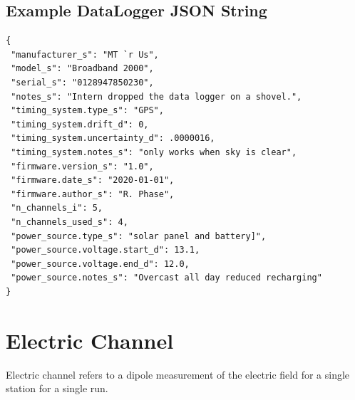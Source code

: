 \documentclass{article}
\begin{document}
\newpage
\subsection{Example DataLogger JSON String}

\begin{verbatim}
{
 "manufacturer_s": "MT `r Us",
 "model_s": "Broadband 2000",
 "serial_s": "0128947850230",
 "notes_s": "Intern dropped the data logger on a shovel.",
 "timing_system.type_s": "GPS",
 "timing_system.drift_d": 0,
 "timing_system.uncertainty_d": .0000016,
 "timing_system.notes_s": "only works when sky is clear",
 "firmware.version_s": "1.0",
 "firmware.date_s": "2020-01-01",
 "firmware.author_s": "R. Phase",
 "n_channels_i": 5,
 "n_channels_used_s": 4,
 "power_source.type_s": "solar panel and battery]",
 "power_source.voltage.start_d": 13.1,
 "power_source.voltage.end_d": 12.0,
 "power_source.notes_s": "Overcast all day reduced recharging"
}
\end{verbatim}

\newpage
\section{Electric Channel}

Electric channel refers to a dipole measurement of the electric field for a single station for a single run.
 
\end{document}

